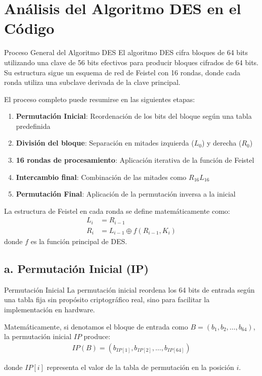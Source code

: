\section{Análisis del Algoritmo DES en el Código}

\begin{cryptomethod}{Proceso General del Algoritmo DES}
	El algoritmo DES cifra bloques de 64 bits utilizando una clave de 56 bits efectivos para producir bloques cifrados de 64 bits. Su estructura sigue un esquema de red de Feistel con 16 rondas, donde cada ronda utiliza una subclave derivada de la clave principal.

	El proceso completo puede resumirse en las siguientes etapas:
	\begin{enumerate}
		\item \textbf{Permutación Inicial}: Reordenación de los bits del bloque según una tabla predefinida
		\item \textbf{División del bloque}: Separación en mitades izquierda ($L_0$) y derecha ($R_0$)
		\item \textbf{16 rondas de procesamiento}: Aplicación iterativa de la función de Feistel
		\item \textbf{Intercambio final}: Combinación de las mitades como $R_{16}L_{16}$
		\item \textbf{Permutación Final}: Aplicación de la permutación inversa a la inicial
	\end{enumerate}

	La estructura de Feistel en cada ronda se define matemáticamente como:
	\begin{align}
		L_i & = R_{i-1}                        \\
		R_i & = L_{i-1} \oplus f(R_{i-1}, K_i)
	\end{align}
	donde $f$ es la función principal de DES.
\end{cryptomethod}

\subsection{a. Permutación Inicial (IP)}

\begin{cryptoanalysis}{Permutación Inicial}
	La permutación inicial reordena los 64 bits de entrada según una tabla fija sin propósito criptográfico real, sino para facilitar la implementación en hardware.

	Matemáticamente, si denotamos el bloque de entrada como $B = (b_1, b_2, \ldots, b_{64})$, la permutación inicial $IP$ produce:
	\begin{align}
		IP(B) = (b_{IP[1]}, b_{IP[2]}, \ldots, b_{IP[64]})
	\end{align}

	donde $IP[i]$ representa el valor de la tabla de permutación en la posición $i$.
\end{cryptoanalysis}


